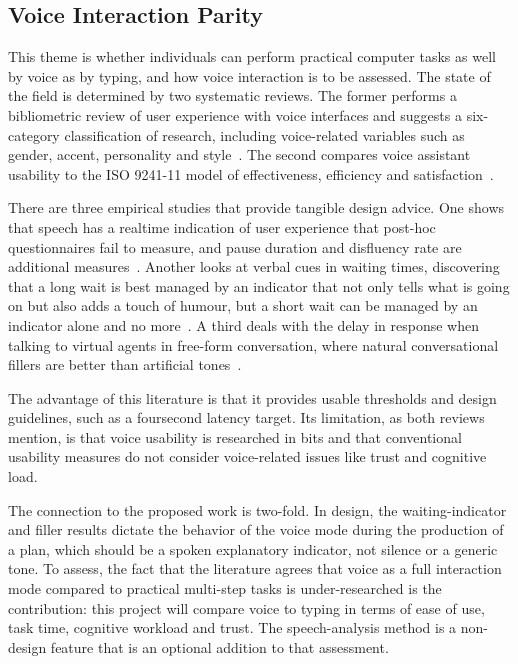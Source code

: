 \documentclass{FastFyp}
\begin{document}
\subsection{Voice Interaction Parity}
This theme is whether individuals can perform practical computer tasks as well by voice as by typing, and how voice interaction is to be assessed. The state of the field is determined by two systematic reviews. The former performs a bibliometric review of user experience with voice interfaces and suggests a six-category classification of research, including voice-related variables such as gender, accent, personality and style~\cite{ref:deshmukh2024}. The second compares voice assistant usability to the ISO 9241-11 model of effectiveness, efficiency and satisfaction~\cite{ref:dutsinma2022}.

There are three empirical studies that provide tangible design advice. One shows that speech has a realtime indication of user experience that post-hoc questionnaires fail to measure, and pause duration and disfluency rate are additional measures~\cite{ref:ma2026}. Another looks at verbal cues in waiting times, discovering that a long wait is best managed by an indicator that not only tells what is going on but also adds a touch of humour, but a short wait can be managed by an indicator alone and no more~\cite{ref:zhang2025}. A third deals with the delay in response when talking to virtual agents in free-form conversation, where natural conversational fillers are better than artificial tones~\cite{ref:wang2025}.

The advantage of this literature is that it provides usable thresholds and design guidelines, such as a foursecond latency target. Its limitation, as both reviews mention, is that voice usability is researched in bits and that conventional usability measures do not consider voice-related issues like trust and cognitive load.

The connection to the proposed work is two-fold. In design, the waiting-indicator and filler results dictate the behavior of the voice mode during the production of a plan, which should be a spoken explanatory indicator, not silence or a generic tone. To assess, the fact that the literature agrees that voice as a full interaction mode compared to practical multi-step tasks is under-researched is the contribution: this project will compare voice to typing in terms of ease of use, task time, cognitive workload and trust. The speech-analysis method is a non-design feature that is an optional addition to that assessment.
\end{document}
